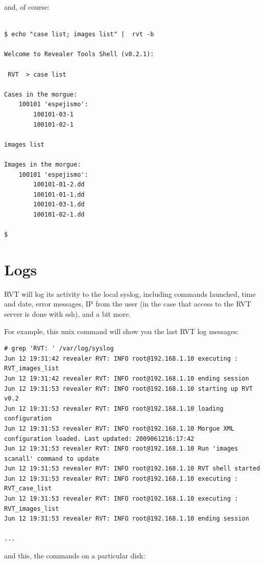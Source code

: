 \documentclass[a4paper,11pt,oneside]{report}
\begin{document}
and, of course:


\begin{verbatim}
 
$ echo "case list; images list" |  rvt -b

Welcome to Revealer Tools Shell (v0.2.1):

 RVT  > case list

Cases in the morgue: 
	100101 'espejismo':
		100101-03-1
		100101-02-1

images list

Images in the morgue: 
	100101 'espejismo':
		100101-01-2.dd
		100101-01-1.dd
		100101-03-1.dd
		100101-02-1.dd

$
\end{verbatim}





\section{Logs}

RVT will log its activity to the local syslog, including commands launched, time and date, error messages, IP from the user (in the case that access to the RVT server is done with ssh), and a bit more.

For example, this unix command will show you the last RVT log messages:

{ \footnotesize
\begin{verbatim}
# grep 'RVT: ' /var/log/syslog
Jun 12 19:31:42 revealer RVT: INFO root@192.168.1.10 executing : RVT_images_list  
Jun 12 19:31:42 revealer RVT: INFO root@192.168.1.10 ending session 
Jun 12 19:31:53 revealer RVT: INFO root@192.168.1.10 starting up RVT v0.2 
Jun 12 19:31:53 revealer RVT: INFO root@192.168.1.10 loading configuration 
Jun 12 19:31:53 revealer RVT: INFO root@192.168.1.10 Morgue XML configuration loaded. Last updated: 2009061216:17:42 
Jun 12 19:31:53 revealer RVT: INFO root@192.168.1.10 Run 'images scanall' command to update 
Jun 12 19:31:53 revealer RVT: INFO root@192.168.1.10 RVT shell started 
Jun 12 19:31:53 revealer RVT: INFO root@192.168.1.10 executing : RVT_case_list  
Jun 12 19:31:53 revealer RVT: INFO root@192.168.1.10 executing : RVT_images_list  
Jun 12 19:31:53 revealer RVT: INFO root@192.168.1.10 ending session 

...
\end{verbatim}
}

and this, the commands on a particular disk:
\end{document}
